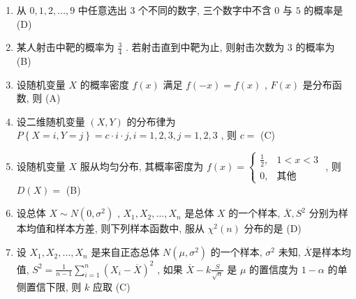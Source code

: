 \begin{enumerate}
	\item 从 $0,1,2,\ldots,9$ 中任意选出 $3$ 个不同的数字, 三个数字中不含 $0$ 与 $5$ 的概率是 (\hspace{0.25pc}D\hspace{0.25pc})
	
	\item 某人射击中靶的概率为 $\frac{3}{4}$ . 若射击直到中靶为止, 则射击次数为 $3$ 的概率为 (\hspace{0.25pc}B\hspace{0.25pc})
	
	\item 设随机变量 $X$ 的概率密度 $f(x)$ 满足 $f(-x)=f(x)$ , $F(x)$ 是分布函数, 则 (\hspace{0.25pc}A\hspace{0.25pc})
	
	\item 设二维随机变量 $(X,Y)$ 的分布律为 $P\left\{X=i,Y=j\right\}=c\cdot i\cdot j,i=1,2,3,j=1,2,3$ , 则 $c=$ (\hspace{0.25pc}C\hspace{0.25pc})
	
	\item 设随机变量 $X$ 服从均匀分布, 其概率密度为 $f(x)=
	\begin{cases}
	\frac{1}{2}, & 1<x<3\\
	0, & \text{其他}
	\end{cases}
	$ , 则 $D(X)=$ (\hspace{0.25pc}B\hspace{0.25pc})
	
	\item 设总体 $X\sim N\left(0,\sigma^2\right)$ , $X_1,X_2,\ldots,X_n$ 是总体 $X$ 的一个样本, $\overline{X},S^2$ 分别为样本均值和样本方差, 则下列样本函数中, 服从 $\chi^2(n)$ 分布的是 (\hspace{0.25pc}D\hspace{0.25pc})
	
	\item 设 $X_1,X_2,\ldots,X_n$ 是来自正态总体 $N\left(\mu,\sigma^2\right)$ 的一个样本, $\sigma^2$ 未知, $\overline{X}$是样本均值, $S^2=\frac{1}{n-1}\sum_{i=1}^{n}\left(X_i-\overline{X}\right)^2$ , 如果 $\overline{X}-k\frac{S}{\sqrt{n}}$ 是 $\mu$ 的置信度为 $1-\alpha$ 的单侧置信下限, 则 $k$ 应取 (\hspace{0.25pc}C\hspace{0.25pc})
\end{enumerate}

